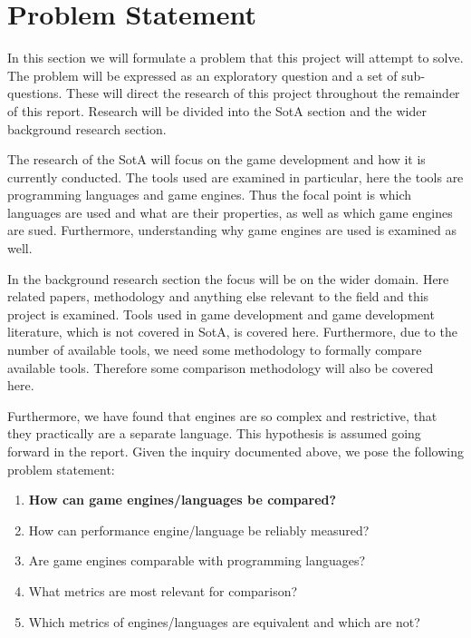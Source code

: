 \section{Problem Statement}
In this section we will formulate a problem that this project will attempt to solve. The problem will be expressed as an exploratory question and a set of sub-questions. These will direct the research of this project throughout the remainder of this report. Research will be divided into the \ac{SotA} section and the wider background research section.

The research of the \ac{SotA} will focus on the game development and how it is currently conducted. The tools used are examined in particular, here the tools are programming languages and game engines. Thus the focal point is which languages are used and what are their properties, as well as which game engines are sued. Furthermore, understanding why game engines are used is examined as well.

In the background research section the focus will be on the wider domain. Here related papers, methodology and anything else relevant to the field and this project is examined. Tools used in game development and game development literature, which is not covered in \ac{SotA}, is covered here. Furthermore, due to the number of available tools, we need some methodology to formally compare available tools. Therefore some comparison methodology will also be covered here.

Furthermore, we have found that engines are so complex and restrictive, that they practically are a separate language. This hypothesis is assumed going forward in the report. Given the inquiry documented above, we pose the following problem statement:

\begin{center}
    \begin{enumerate}
        \item \textbf{How can game engines/languages be compared?}
        \item How can performance engine/language be reliably measured?
        \item Are game engines comparable with programming languages?
        \item What metrics are most relevant for comparison?
        \item Which metrics of engines/languages are equivalent and which are not?
    \end{enumerate}
\end{center}